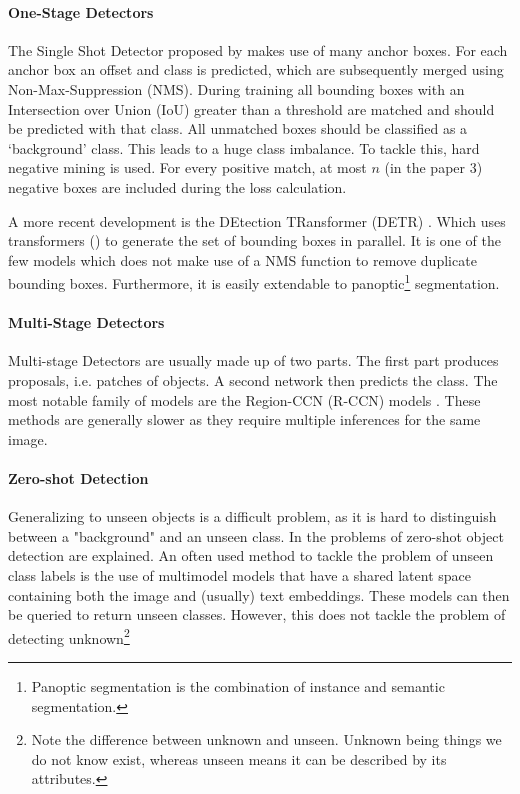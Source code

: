 \paragraph*{One-Stage Detectors}
The Single Shot Detector proposed by \citep{liu2016ssd} makes use of many anchor boxes. For each anchor box an offset and class is predicted, which are subsequently merged using Non-Max-Suppression (NMS). During training all bounding boxes with an Intersection over Union (IoU) greater than a threshold are matched and should be predicted with that class. All unmatched boxes should be classified as a `background' class. This leads to a huge class imbalance. To tackle this, hard negative mining is used. For every positive match, at most $n$ (in the paper 3) negative boxes are included during the loss calculation.

A more recent development is the DEtection TRansformer (DETR) \cite{carion2020end}. Which uses transformers (\cite{vaswani2017attention, dosovitskiy2021image}) to generate the set of bounding boxes in parallel. It is one of the few models which does not make use of a NMS function to remove duplicate bounding boxes. Furthermore, it is easily extendable to panoptic\footnote{Panoptic segmentation is the combination of instance and semantic segmentation.} segmentation.

\paragraph*{Multi-Stage Detectors}
Multi-stage Detectors are usually made up of two parts. The first part produces proposals, i.e. patches of objects. A second network then predicts the class. The most notable family of models are the Region-CCN (R-CCN) models \cite{girshick2015fast, ren2015faster}. These methods are generally slower as they require multiple inferences for the same image.


\paragraph*{Zero-shot Detection}
Generalizing to unseen objects is a difficult problem, as it is hard to distinguish between a "background" and an unseen class. In \cite{bansal2018zeroshot} the problems of zero-shot object detection are explained. An often used method to tackle the problem of unseen class labels is the use of multimodel models that have a shared latent space containing both the image and (usually) text embeddings. These models can then be queried to return unseen classes. However, this does not tackle the problem of detecting unknown\footnote{Note the difference between unknown and unseen. Unknown being things we do not know exist, whereas unseen means it can be described by its attributes.}

